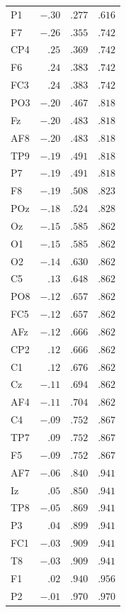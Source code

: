 {\begin{longtable}{lrrr}
P1 & $-.30$ & $.277$ & $.616$ \\
F7 & $-.26$ & $.355$ & $.742$ \\
CP4 & $.25$ & $.369$ & $.742$ \\
F6 & $.24$ & $.383$ & $.742$ \\
FC3 & $.24$ & $.383$ & $.742$ \\
PO3 & $-.20$ & $.467$ & $.818$ \\
Fz & $-.20$ & $.483$ & $.818$ \\
AF8 & $-.20$ & $.483$ & $.818$ \\
TP9 & $-.19$ & $.491$ & $.818$ \\
P7 & $-.19$ & $.491$ & $.818$ \\
F8 & $-.19$ & $.508$ & $.823$ \\
POz & $-.18$ & $.524$ & $.828$ \\
Oz & $-.15$ & $.585$ & $.862$ \\
O1 & $-.15$ & $.585$ & $.862$ \\
O2 & $-.14$ & $.630$ & $.862$ \\
C5 & $.13$ & $.648$ & $.862$ \\
PO8 & $-.12$ & $.657$ & $.862$ \\
FC5 & $-.12$ & $.657$ & $.862$ \\
AFz & $-.12$ & $.666$ & $.862$ \\
CP2 & $.12$ & $.666$ & $.862$ \\
C1 & $.12$ & $.676$ & $.862$ \\
Cz & $-.11$ & $.694$ & $.862$ \\
AF4 & $-.11$ & $.704$ & $.862$ \\
C4 & $-.09$ & $.752$ & $.867$ \\
TP7 & $.09$ & $.752$ & $.867$ \\
F5 & $-.09$ & $.752$ & $.867$ \\
AF7 & $-.06$ & $.840$ & $.941$ \\
Iz & $.05$ & $.850$ & $.941$ \\
TP8 & $-.05$ & $.869$ & $.941$ \\
P3 & $.04$ & $.899$ & $.941$ \\
FC1 & $-.03$ & $.909$ & $.941$ \\
T8 & $-.03$ & $.909$ & $.941$ \\
F1 & $.02$ & $.940$ & $.956$ \\
P2 & $-.01$ & $.970$ & $.970$ \\
\end{longtable}
}
